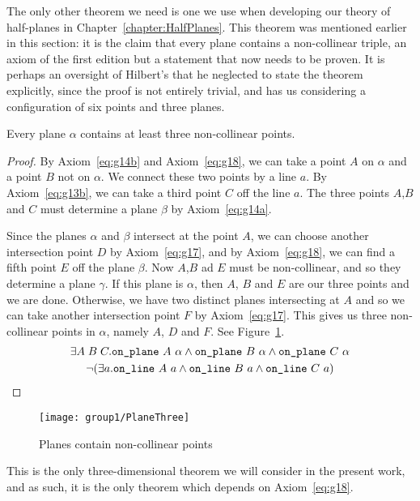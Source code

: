 The only other theorem we need is one we use when developing our theory of half-planes in Chapter~\ref{chapter:HalfPlanes}. This theorem was mentioned earlier in this section: it is the claim that every plane contains a non-collinear triple, an axiom of the first edition but a statement that now needs to be proven. It is perhaps an oversight of Hilbert's that he neglected to state the theorem explicitly, since the proof is not entirely trivial, and has us considering a configuration of six points and three planes.

\label{sec:PlaneThree}
\begin{theorem}\label{eq:PlaneThree}
Every plane $\alpha$ contains at least three non-collinear points.
\end{theorem}
\begin{proof}
By Axiom~\ref{eq:g14b} and Axiom~\ref{eq:g18}, we can take a point $A$ on $\alpha$ and a point $B$ not on $\alpha$. We connect these two points by a line $a$. By Axiom~\ref{eq:g13b}, we can take a third point $C$ off the line $a$. The three points $A$,$B$ and $C$ must determine a plane $\beta$ by Axiom~\ref{eq:g14a}.

Since the planes $\alpha$ and $\beta$ intersect at the point $A$, we can choose another intersection point $D$ by Axiom~\ref{eq:g17}, and by Axiom~\ref{eq:g18}, we can find a fifth point $E$ off the plane $\beta$. Now $A$,$B$ ad $E$ must be non-collinear, and so they determine a plane $\gamma$. If this plane is $\alpha$, then $A$, $B$ and $E$ are our three points and we are done. Otherwise, we have two distinct planes intersecting at $A$ and so we can take another intersection point $F$ by Axiom~\ref{eq:g17}. This gives us three non-collinear points in $\alpha$, namely $A$, $D$ and $F$. See Figure~\ref{fig:PlaneThree}.
\begin{multline}
\exists A\;B\;C. \code{on\_plane}\ A\ \alpha \wedge \code{on\_plane}\ B\ \alpha \wedge \code{on\_plane}\ C\ \alpha\\
\Triangle{a}{A}{B}{C}
\end{multline}
\end{proof}
\begin{figure}
\centering\texttt{[image: group1/PlaneThree]}
\caption{Planes contain non-collinear points}
\label{fig:PlaneThree}
\end{figure}

This is the only three-dimensional theorem we will consider in the present work, and as such, it is the only theorem which depends on Axiom~\ref{eq:g18}.

